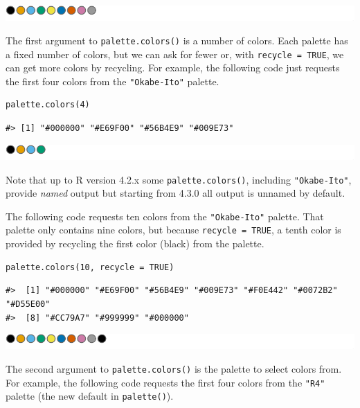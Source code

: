 \includegraphics[width=1\linewidth]{color_files/figure-latex/Okabe-Ito-1}

The first argument to \texttt{palette.colors()} is a number of colors.
Each palette has a fixed number of colors, but we can ask for fewer or,
with \texttt{recycle\ =\ TRUE}, we can get more colors by recycling.
For example, the following code just requests the first four colors
from the \texttt{"Okabe-Ito"} palette.

\begin{verbatim}
palette.colors(4)
\end{verbatim}

\begin{verbatim}
#> [1] "#000000" "#E69F00" "#56B4E9" "#009E73"
\end{verbatim}

\includegraphics[width=1\linewidth]{color_files/figure-latex/short-1}

Note that up to R version 4.2.x some \texttt{palette.colors()}, including \texttt{"Okabe-Ito"},
provide \emph{named} output but starting from 4.3.0 all output is unnamed by default.

The following code requests ten colors from the \texttt{"Okabe-Ito"} palette.
That palette only contains nine colors, but because \texttt{recycle\ =\ TRUE},
a tenth color is provided by recycling the first color (black) from the palette.

\begin{verbatim}
palette.colors(10, recycle = TRUE)
\end{verbatim}

\begin{verbatim}
#>  [1] "#000000" "#E69F00" "#56B4E9" "#009E73" "#F0E442" "#0072B2" "#D55E00"
#>  [8] "#CC79A7" "#999999" "#000000"
\end{verbatim}

\includegraphics[width=1\linewidth]{color_files/figure-latex/recycle-1}

The second argument to \texttt{palette.colors()} is the palette to select colors
from. For example, the following code requests the first four colors
from the \texttt{"R4"} palette (the new default in \texttt{palette()}).

